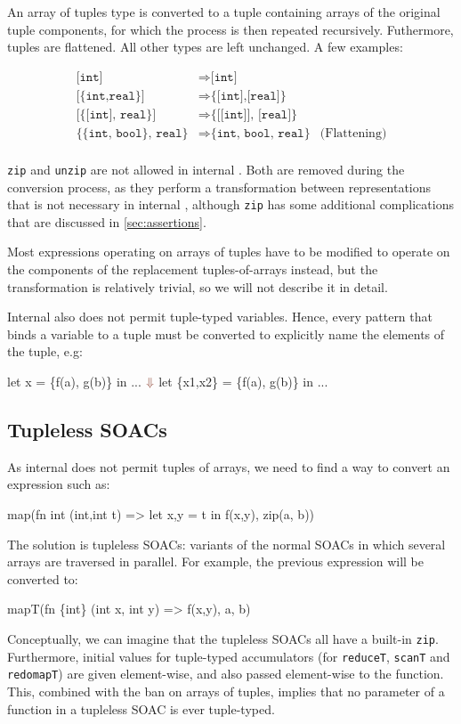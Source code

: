An array of tuples type is converted to a tuple containing arrays of
the original tuple components, for which the process is then repeated
recursively.  Futhermore, tuples are flattened.  All other types are
left unchanged.  A few examples:

\begin{align*}
\texttt{[int]} &\Rightarrow \texttt{[int]} \\
\texttt{[\{int,real\}]} &\Rightarrow \texttt{\{[int],[real]\}} \\
\texttt{[\{[int], real\}]} &\Rightarrow \texttt{\{[[int]], [real]\}} \\
\texttt{\{\{int, bool\}, real\}} &\Rightarrow \texttt{\{int, bool, real\}} & \text{(Flattening)} \\
\end{align*}

\texttt{zip} and \texttt{unzip} are not allowed in internal \LO{}.
Both are removed during the conversion process, as they perform a
transformation between representations that is not necessary in
internal \LO{}, although \texttt{zip} has some additional
complications that are discussed in \cref{sec:assertions}.

Most expressions operating on arrays of tuples have to be modified to
operate on the components of the replacement tuples-of-arrays instead,
but the transformation is relatively trivial, so we will not describe
it in detail.

Internal \LO{} also does not permit tuple-typed variables.  Hence,
every pattern that binds a variable to a tuple must be converted to
explicitly name the elements of the tuple, e.g:

\begin{colorcode}
let x = \{f(a), g(b)\} in
...
  \(\emp{\Downarrow}\)
let \{x1,x2\} = \{f(a), g(b)\} in
...
\end{colorcode}

\subsection{Tupleless SOACs}

As internal \LO{} does not permit tuples of arrays, we need to find a
way to convert an expression such as:
\begin{colorcode}
map(fn int ({int,int} t) =>
      let {x,y} = t in
      f(x,y),
    zip(a, b))
\end{colorcode}
The solution is tupleless SOACs: variants of the normal SOACs in which
several arrays are traversed in parallel.  For example, the previous
expression will be converted to:
\begin{colorcode}
mapT(fn \{int\} (int x, int y) =>
       f(x,y),
     a, b)
\end{colorcode}
Conceptually, we can imagine that the tupleless SOACs all have a
built-in \texttt{zip}.  Furthermore, initial values for tuple-typed
accumulators (for \texttt{reduceT}, \texttt{scanT} and
\texttt{redomapT}) are given element-wise, and also passed
element-wise to the function.  This, combined with the ban on arrays
of tuples, implies that no parameter of a function in a tupleless SOAC
is ever tuple-typed.

